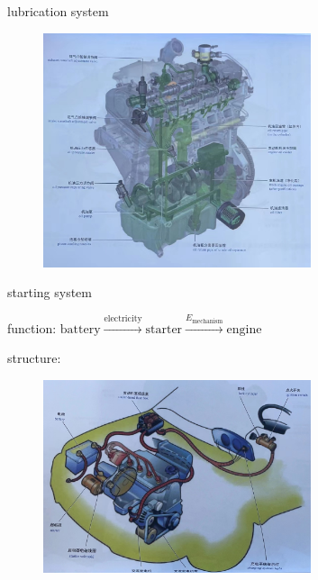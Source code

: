 \begin{frame}
	\begin{block}{lubrication system}
		\begin{figure}[htbp]
			\centering
			\includegraphics[width=0.7\textwidth]{2-8}
		\end{figure}
	\end{block}
\end{frame}
\begin{frame}
	\begin{block}{starting system}
		\begin{compactitem}
			\item function: $ \text{battery} \xrightarrow{\text{electricity}} \text{starter} \xrightarrow{E_\text{mechanism}} \text{engine}$
			\item structure:
				\begin{figure}[htbp]
					\centering
					\includegraphics[width=0.7\textwidth]{2-9}
				\end{figure}
		\end{compactitem}
	\end{block}
\end{frame}
